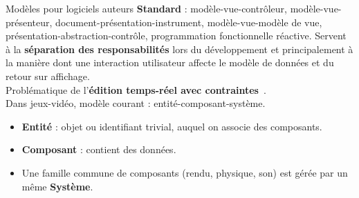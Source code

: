 \begin{block}{Modèles pour logiciels auteurs}
\textbf{Standard} : modèle-vue-contrôleur, modèle-vue-présenteur, document-présentation-instrument, modèle-vue-modèle de vue, présentation-abstraction-contrôle, programmation fonctionnelle réactive.
Servent à la \textbf{séparation des responsabilités} lors du développement et principalement à la manière dont une interaction utilisateur affecte le modèle de données et du retour sur affichage.~\\

Problématique de l'\textbf{édition temps-réel avec contraintes}~\cite{laffra2012object}.~\\

Dans jeux-vidéo, modèle courant : entité-composant-système.
\begin{itemize}
\item \textbf{Entité} : objet ou identifiant trivial, auquel on associe des composants. 
\item \textbf{Composant} : contient des données.
\item Une famille commune de composants (rendu, physique, son) est gérée 
par un même \textbf{Système}.
\end{itemize}

\end{block}